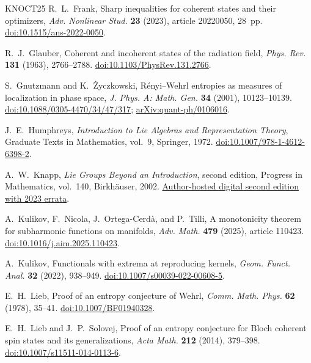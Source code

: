 \documentclass[11pt,reqno]{amsart}
\numberwithin{equation}{section}
\theoremstyle{plain}
\theoremstyle{remark}
\begin{document}
\begin{thebibliography}{KNOCT25}
R.~L.~Frank,
Sharp inequalities for coherent states and their optimizers,
\emph{Adv. Nonlinear Stud.} \textbf{23} (2023), article 20220050, 28~pp.
\href{https://doi.org/10.1515/ans-2022-0050}{doi:10.1515/ans-2022-0050}.

R.~J.~Glauber,
Coherent and incoherent states of the radiation field,
\emph{Phys. Rev.} \textbf{131} (1963), 2766--2788.
\href{https://doi.org/10.1103/PhysRev.131.2766}{doi:10.1103/PhysRev.131.2766}.

S.~Gnutzmann and K.~\.{Z}yczkowski,
R\'enyi--Wehrl entropies as measures of localization in phase space,
\emph{J. Phys. A: Math. Gen.} \textbf{34} (2001), 10123--10139.
\href{https://doi.org/10.1088/0305-4470/34/47/317}{doi:10.1088/0305-4470/34/47/317};
\href{https://arxiv.org/abs/quant-ph/0106016}{arXiv:quant-ph/0106016}.

J.~E.~Humphreys,
\emph{Introduction to Lie Algebras and Representation Theory},
Graduate Texts in Mathematics, vol.~9, Springer, 1972.
\href{https://doi.org/10.1007/978-1-4612-6398-2}{doi:10.1007/978-1-4612-6398-2}.

A.~W.~Knapp,
\emph{Lie Groups Beyond an Introduction}, second edition,
Progress in Mathematics, vol.~140, Birkh\"auser, 2002.
\href{https://www.math.stonybrook.edu/~aknapp/download/Beyond2-clickable.pdf}
{Author-hosted digital second edition with 2023 errata}.

A.~Kulikov, F.~Nicola, J.~Ortega-Cerd\`a, and P.~Tilli,
A monotonicity theorem for subharmonic functions on manifolds,
\emph{Adv. Math.} \textbf{479} (2025), article 110423.
\href{https://doi.org/10.1016/j.aim.2025.110423}{doi:10.1016/j.aim.2025.110423}.

A.~Kulikov,
Functionals with extrema at reproducing kernels,
\emph{Geom. Funct. Anal.} \textbf{32} (2022), 938--949.
\href{https://doi.org/10.1007/s00039-022-00608-5}{doi:10.1007/s00039-022-00608-5}.

E.~H.~Lieb,
Proof of an entropy conjecture of Wehrl,
\emph{Comm. Math. Phys.} \textbf{62} (1978), 35--41.
\href{https://doi.org/10.1007/BF01940328}{doi:10.1007/BF01940328}.

E.~H.~Lieb and J.~P.~Solovej,
Proof of an entropy conjecture for Bloch coherent spin states and its
generalizations,
\emph{Acta Math.} \textbf{212} (2014), 379--398.
\href{https://doi.org/10.1007/s11511-014-0113-6}{doi:10.1007/s11511-014-0113-6}.


\end{thebibliography}
\end{document}
